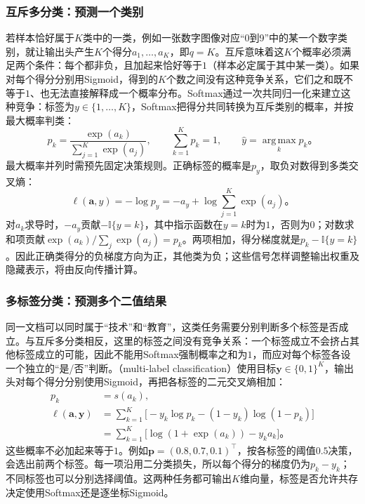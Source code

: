 \subsubsection{互斥多分类：预测一个类别}
\label{sec:ffn-output-multiclass}

若样本恰好属于$K$类中的一类，例如一张数字图像对应“0到9”中的某一个数字类别，就让输出头产生$K$个得分$a_1,\ldots,a_K$，即$q=K$。互斥意味着这$K$个概率必须满足两个条件：每个都非负，且加起来恰好等于$1$（样本必定属于其中某一类）。如果对每个得分分别用Sigmoid，得到的$K$个数之间没有这种竞争关系，它们之和既不等于$1$、也无法直接解释成一个概率分布。Softmax通过一次共同归一化来建立这种竞争：标签为$y\in\{1,\ldots,K\}$，Softmax把得分共同转换为互斥类别的概率，并按最大概率判类：
\begin{equation}
  p_k=\frac{\exp(a_k)}{\sum_{j=1}^{K}\exp(a_j)},
  \qquad \sum_{k=1}^{K}p_k=1,\qquad
  \widehat y=\operatorname*{arg\,max}_{k}p_k\text{。}
  \label{eq:ffn-multiclass-output}
\end{equation}
最大概率并列时需预先固定决策规则。正确标签的概率是$p_y$，取负对数得到多类交叉熵：
\begin{equation}
  \ell(\bm{a},y)=-\log p_y
  =-a_y+\log\sum_{j=1}^{K}\exp(a_j)\text{。}
  \label{eq:ffn-multiclass-cross-entropy}
\end{equation}
对$a_k$求导时，$-a_y$贡献$-\mathbb I\{y=k\}$，其中指示函数在$y=k$时为$1$，否则为$0$；对数求和项贡献$\exp(a_k)/\sum_j\exp(a_j)=p_k$。两项相加，得分梯度就是$p_k-\mathbb I\{y=k\}$。因此正确类得分的负梯度方向为正，其他类为负；这些信号怎样调整输出权重及隐藏表示，将由反向传播计算。

\subsubsection{多标签分类：预测多个二值结果}
\label{sec:ffn-output-multilabel}

同一文档可以同时属于“技术”和“教育”，这类任务需要分别判断多个标签是否成立。与互斥多分类相反，这里的标签之间没有竞争关系：一个标签成立不会挤占其他标签成立的可能，因此不能用Softmax强制概率之和为$1$，而应对每个标签各设一个独立的“是/否”判断。（multi-label classification）使用目标$\bm y\in\{0,1\}^{K}$，输出头对每个得分分别使用Sigmoid，再把各标签的二元交叉熵相加：
\begin{equation}
  \begin{aligned}
    p_k&=s(a_k),\\
    \ell(\bm{a},\bm{y})
      &=\sum_{k=1}^{K}\bigl[-y_k\log p_k-(1-y_k)\log(1-p_k)\bigr]\\
      &=\sum_{k=1}^{K}\bigl[\log(1+\exp(a_k))-y_k a_k\bigr]\text{。}
  \end{aligned}
  \label{eq:ffn-multilabel-loss}
\end{equation}
这些概率不必加起来等于$1$。例如$\bm p=(0.8,0.7,0.1)^{\top}$，按各标签的阈值$0.5$决策，会选出前两个标签。每一项沿用二分类损失，所以每个得分的梯度仍为$p_k-y_k$；不同标签也可以分别选择阈值。这两种任务都可输出$K$维向量，标签是否允许共存决定使用Softmax还是逐坐标Sigmoid。

